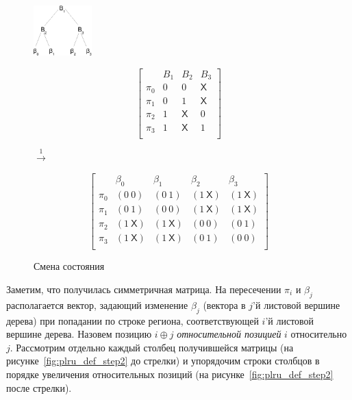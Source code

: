 \begin{figure}[h]
\parbox{0.2\textwidth}{ \centering
  \includegraphics[width=0.2\textwidth]{1.review/btree}
}
\parbox{0.25\textwidth}{
$$ \left[
  \begin{array}{c|ccc}
          & B_1 & B_2 & B_3 \\ \hline
    \pi_0 & 0 & 0 & \textsf{X} \\
    \pi_1 & 0 & 1 & \textsf{X} \\
    \pi_2 & 1 & \textsf{X} & 0 \\
    \pi_3 & 1 & \textsf{X} & 1 \\
  \end{array}
\right]
$$
} $\stackrel{1}{\longrightarrow}$ %
\parbox{0.4\textwidth}{
$$ \left[
  \begin{array}{c|cccc}
          & \beta_0 & \beta_1 & \beta_2 & \beta_3 \\ \hline
    \pi_0 & (0~0) & (0~1) & (1~\textsf{X}) & (1~\textsf{X}) \\
    \pi_1 & (0~1) & (0~0) & (1~\textsf{X}) & (1~\textsf{X}) \\
    \pi_2 & (1~\textsf{X}) & (1~\textsf{X}) & (0~0) & (0~1) \\
    \pi_3 & (1~\textsf{X}) & (1~\textsf{X}) & (0~1) & (0~0) \\
  \end{array}
\right]
$$
}
\caption{Смена состояния}\label{fig:plru_def_step1}
\end{figure}

Заметим, что получилась симметричная матрица. На пересечении $\pi_i$
и $\beta_j$ располагается вектор, задающий изменение $\beta_j$ (вектора в $j$'й
листовой вершине дерева) при попадании по строке региона, соответствующей $i$'й листовой вершине дерева. Назовем позицию $i \oplus j$ \emph{относительной позицией}
$i$ относительно $j$. Рассмотрим отдельно каждый столбец
получившейся матрицы (на рисунке~\ref{fig:plru_def_step2} до стрелки) и упорядочим строки столбцов в порядке увеличения относительных позиций (на рисунке~\ref{fig:plru_def_step2} после стрелки).

